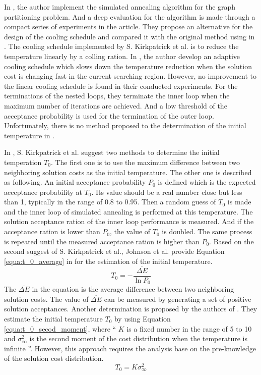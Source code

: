 In \cite{doi:10.1287/opre.37.6.865}, the author implement the simulated 
annealing algorithm for the graph partitioning problem.
And a deep evaluation for the algorithm is made through a compact series
of experiments in the article.
They propose an alternative for the design of the cooling schedule and 
compared it with the original method using in \cite{10.2307/1690046}.
The cooling schedule implemented by S. Kirkpatrick et al. is to reduce
the temperature linearly by a colling ration.
In \cite{doi:10.1287/opre.37.6.865}, the author develop an adaptive
cooling schedule which slows down the temperature reduction when the solution
cost is changing fast in the current searching region. However, no improvement
to the linear cooling schedule is found in their conducted experiments.
For the terminations of the nested loops, they terminate the inner loop when
the maximum number of iterations are achieved. And a low threshold of the
acceptance probability is used for the termination of the outer loop.
Unfortunately, there is no method proposed to the determination of the initial
temperature in \cite{doi:10.1287/opre.37.6.865}.

In \cite{10.2307/1690046}, S. Kirkpatrick et al. suggest two methods to determine
the initial temperation $T_{0}$. The first one is to use the maximum difference
between two neighboring solution costs as the initial temperature. The other one
is described as following. An initial acceptance probability $P_{0}$ is defined
which is the expected acceptance probability at $T_{0}$.
Its value should be a real number close but less than 1, typically in the range of
0.8 to 0.95.
Then a random guess of $T_{0}$ is made and the inner loop of
simulated annealing is performed at this temperature. The solution
acceptance ration of the inner loop performance is measured. And if the
acceptance ration is lower than $P_{0}$, the value of $T_{0}$ is doubled.
The same process is repeated until the measured acceptance
ration is higher than $P_{0}$.
Based on the second suggest of S. Kirkpatrick et al., Johnson et al.
provide Equation \ref{equa:t_0_average} in \cite{Johnson:1991:OSA:108188.108193}
for the estimation of the initial temperature.
\begin{equation}
\label{equa:t_0_average}
	T_{0}= - \dfrac{\overline{\Delta E}}{\ln P_{0}}
\end{equation}
The $\overline{\Delta E}$ in the equation is the average difference 
between two neighboring solution costs. The value of
$\overline{\Delta E}$ can be measured by generating a set of positive
solution acceptances.
Another determination is proposed
by the authors of \cite{white1984concepts}.
They estimate the initial temperature $T_{0}$ by using Equation
\ref{equa:t_0_secod_moment}, where
\textquotedblleft
$K$ is a fixed number in the range of 5 to 10 and
$\sigma^{2}_{\infty}$ is the second moment of the cost distribution 
when the temperature is infinite
\textquotedblright \cite{Ben-Ameur2004}.
However, this approach requires the analysis base on the pre-knowledge
of the solution cost distribution.
\begin{equation}
\label{equa:t_0_secod_moment}
T_{0} = K \sigma^{2}_{\infty}
\end{equation}